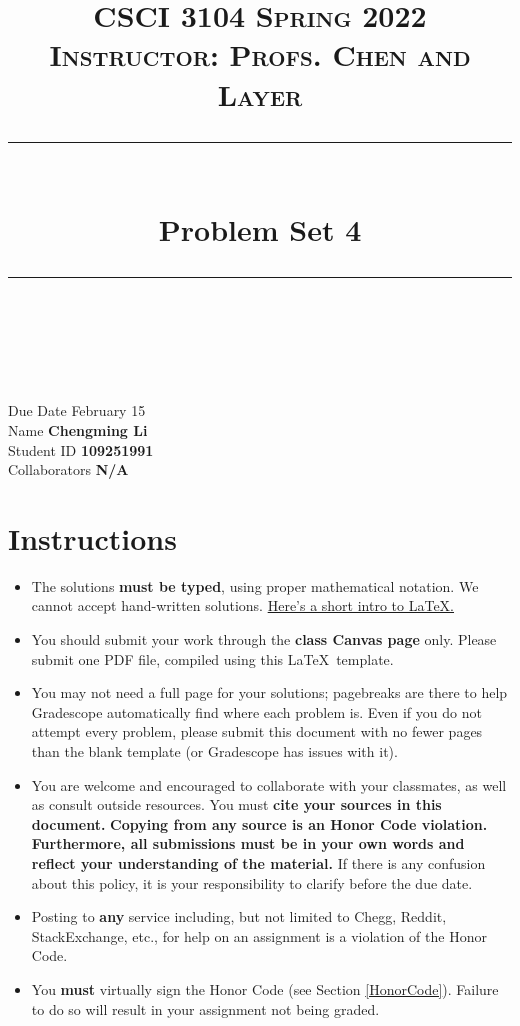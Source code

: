 \documentclass[11pt]{article}
\title{
\normalfont \normalsize 
\textsc{CSCI 3104 Spring 2022 \\ 
Instructor: Profs. Chen and Layer} \\
[10pt] 
\rule{\linewidth}{0.5pt} \\[6pt] 
\huge Problem Set 4 \\
\rule{\linewidth}{2pt}  \\[10pt]
}
\date{}
\theoremstyle{definition}
\theoremstyle{definition}
\theoremstyle{definition}
\begin{document}


\maketitle


\noindent
Due Date \dotfill February 15 \\
Name \dotfill \textbf{Chengming Li} \\
Student ID \dotfill \textbf{109251991} \\
Collaborators \dotfill \textbf{N/A}

\tableofcontents

\section{Instructions}
 \begin{itemize}
	\item The solutions \textbf{must be typed}, using proper mathematical notation. We cannot accept hand-written solutions. \href{http://ece.uprm.edu/~caceros/latex/introduction.pdf}{Here's a short intro to \LaTeX.}
	\item You should submit your work through the \textbf{class Canvas page} only. Please submit one PDF file, compiled using this \LaTeX \ template.
	\item You may not need a full page for your solutions; pagebreaks are there to help Gradescope automatically find where each problem is. Even if you do not attempt every problem, please submit this document with no fewer pages than the blank template (or Gradescope has issues with it).

	\item You are welcome and encouraged to collaborate with your classmates, as well as consult outside resources. You must \textbf{cite your sources in this document.} \textbf{Copying from any source is an Honor Code violation. Furthermore, all submissions must be in your own words and reflect your understanding of the material.} If there is any confusion about this policy, it is your responsibility to clarify before the due date. 

	\item Posting to \textbf{any} service including, but not limited to Chegg, Reddit, StackExchange, etc., for help on an assignment is a violation of the Honor Code.

	\item You \textbf{must} virtually sign the Honor Code (see Section \ref{HonorCode}). Failure to do so will result in your assignment not being graded.
\end{itemize}
\end{document}
